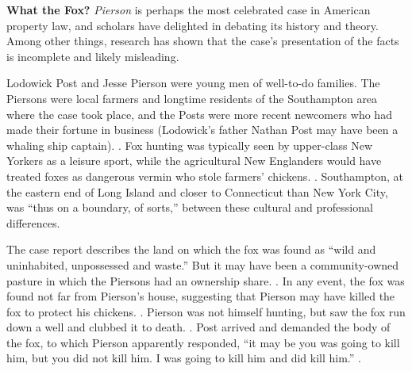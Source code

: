 





\item \textbf{What the Fox?} \emph{Pierson} is perhaps the most celebrated case
in American property law, and scholars have delighted in debating its history
and theory. Among other things, research has shown that the case's presentation
of the facts is incomplete and likely misleading.

Lodowick Post and Jesse Pierson were young men of well-to-do families. The
Piersons were local farmers and longtime residents of the Southampton area
where the case took place, and the Posts were more recent newcomers who had made
their fortune in business (Lodowick's father Nathan Post may have been a whaling
ship captain). . Fox hunting was typically seen by
upper-class New Yorkers as a leisure sport, while the agricultural New
Englanders would have treated foxes as dangerous vermin who stole farmers'
chickens.
.
Southampton, at the eastern end of Long Island and closer to Connecticut than
New York City, was ``thus on a boundary, of sorts,'' between these cultural and
professional differences.

The case report describes the land on which the fox was found as ``wild and
uninhabited, unpossessed and waste.'' But it may have been a community-owned
pasture in which the Piersons had an ownership share. . In any event, the fox was found not far from Pierson's house,
suggesting that Pierson may have killed the fox to protect his chickens.
. Pierson was not himself hunting, but saw
the fox run down a well and clubbed it to death. . Post arrived and demanded the body of the fox, to which Pierson apparently
responded, ``it may be you was going to kill him, but you did not kill him. I
was going to kill him and did kill him.'' .

